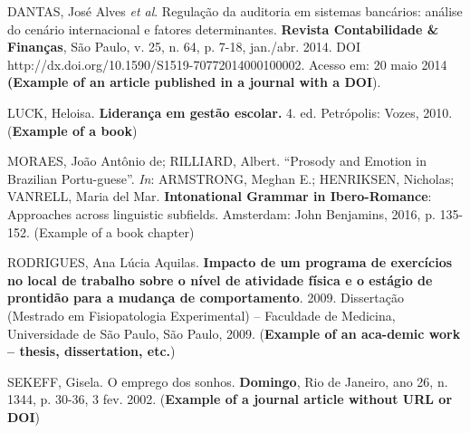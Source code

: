 \documentclass[12pt,a4paper]{article}
\begin{document}
DANTAS, José Alves \textit{et al}. Regulação da auditoria em sistemas bancários: análise do cenário internacional e fatores determinantes. \textbf{Revista Contabilidade & Finanças}, São Paulo, v. 25, n. 64, p. 7-18, jan./abr. 2014. DOI http://dx.doi.org/10.1590/S1519-70772014000100002. Acesso em: 20 maio 2014 \textbf{(Example of an article published in a journal with a DOI}).
\vspace{0.5cm}

LUCK, Heloisa. \textbf{Liderança em gestão escolar.} 4. ed. Petrópolis: Vozes, 2010. (\textbf{Example of a book})
\vspace{0.5cm}

MORAES, João Antônio de; RILLIARD, Albert. “Prosody and Emotion in Brazilian Portu-guese”. \textit{In}: ARMSTRONG, Meghan E.; HENRIKSEN, Nicholas; VANRELL, Maria del Mar. \textbf{Intonational Grammar in Ibero-Romance}: Approaches across linguistic subfields. Amsterdam: John Benjamins, 2016, p. 135-152. (Example of a book chapter)

RODRIGUES, Ana Lúcia Aquilas. \textbf{Impacto de um programa de exercícios no local de trabalho sobre o nível de atividade física e o estágio de prontidão para a mudança de comportamento}. 2009. Dissertação (Mestrado em Fisiopatologia Experimental) – Faculdade de Medicina, Universidade de São Paulo, São Paulo, 2009. (\textbf{Example of an aca-demic work – thesis, dissertation, etc.})

SEKEFF, Gisela. O emprego dos sonhos. \textbf{Domingo}, Rio de Janeiro, ano 26, n. 1344, p. 30-36, 3 fev. 2002. (\textbf{Example of a journal article without URL or DOI})
\end{document}

